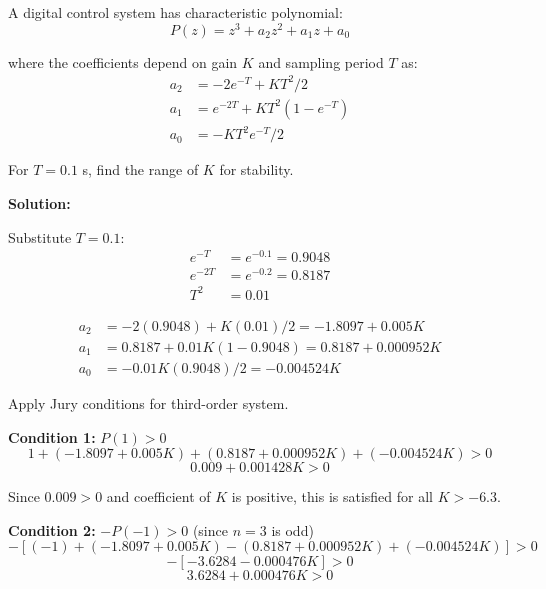 \begin{example}
\label{ex:stability_variations}

A digital control system has characteristic polynomial:
\begin{equation}
P(z) = z^3 + a_2 z^2 + a_1 z + a_0
\end{equation}

where the coefficients depend on gain $K$ and sampling period $T$ as:
\begin{align}
a_2 &= -2e^{-T} + KT^2/2 \\
a_1 &= e^{-2T} + KT^2(1 - e^{-T}) \\
a_0 &= -KT^2 e^{-T}/2
\end{align}

For $T = 0.1$ s, find the range of $K$ for stability.

\textbf{Solution:}

Substitute $T = 0.1$:
\begin{align}
e^{-T} &= e^{-0.1} = 0.9048 \\
e^{-2T} &= e^{-0.2} = 0.8187 \\
T^2 &= 0.01
\end{align}

\begin{align}
a_2 &= -2(0.9048) + K(0.01)/2 = -1.8097 + 0.005K \\
a_1 &= 0.8187 + 0.01K(1 - 0.9048) = 0.8187 + 0.000952K \\
a_0 &= -0.01K(0.9048)/2 = -0.004524K
\end{align}

Apply Jury conditions for third-order system.

\textbf{Condition 1:} $P(1) > 0$
\begin{equation}
1 + (-1.8097 + 0.005K) + (0.8187 + 0.000952K) + (-0.004524K) > 0
\end{equation}
\begin{equation}
0.009 + 0.001428K > 0
\end{equation}

Since $0.009 > 0$ and coefficient of $K$ is positive, this is satisfied for all $K > -6.3$.

\textbf{Condition 2:} $-P(-1) > 0$ (since $n = 3$ is odd)
\begin{equation}
-[(-1) + (-1.8097 + 0.005K) - (0.8187 + 0.000952K) + (-0.004524K)] > 0
\end{equation}
\begin{equation}
-[-3.6284 - 0.000476K] > 0
\end{equation}
\begin{equation}
3.6284 + 0.000476K > 0
\end{equation}


\end{example}
